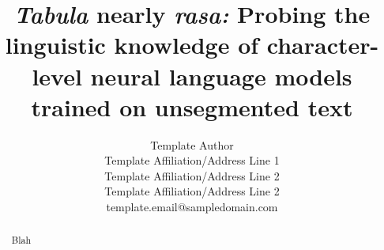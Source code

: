 \newif\iftaclinstructions
\taclinstructionsfalse %
\iftaclinstructions
\renewcommand{\confidential}{}
\renewcommand{\anonsubtext}{(No author info supplied here, for consistency with
TACL-submission anonymization requirements)}
\fi

\title{\emph{Tabula} nearly \emph{rasa:} Probing the linguistic knowledge of character-level neural language models trained on unsegmented text}


\author{
 Template Author \\
 Template Affiliation/Address Line 1 \\
 Template Affiliation/Address Line 2 \\
 Template Affiliation/Address Line 2 \\
  {\sf template.email@sampledomain.com} \\
}

\date{}


\maketitle
\begin{abstract}
  Blah
\end{abstract}


















